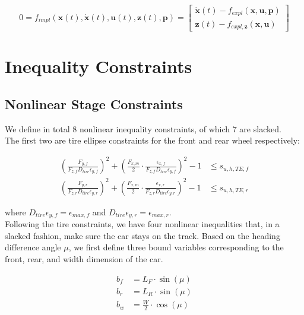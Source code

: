 \documentclass[
a4paper, %
10pt, %
notitlepage,
english]{CSUniSchoolLabReport}
\begin{document}
\begin{equation}
	0 = f_{impl}(\mathbf{x}(t), \dot{\mathbf{x}}(t), \mathbf{u}(t), \mathbf{z}(t), \mathbf{p}) =
	\left[\begin{array}{c}
		\dot{\mathbf{x}}(t) - f_{expl}(\mathbf{x}, \mathbf{u}, \mathbf{p}) \\
		\mathbf{z}(t) - f_{expl, \mathbf{z}}(\mathbf{x}, \mathbf{u})
	\end{array}\right]
\end{equation}


\section{Inequality Constraints}

\subsection{Nonlinear Stage Constraints}

We define in total 8 nonlinear inequality constraints, of which 7 are slacked.\\
The first two are tire ellipse constraints for the front and rear wheel respectively:

\begin{align}
	\left( \frac{F_{y, f}} {F_{z, f} D_{tire} \epsilon_{y, f}} \right)^2
	+ \left(\frac{F_{x,m}}{2} \cdot \frac{\epsilon_{x, f}}{F_{z, f} D_{tire} \epsilon_{y, f}} \right) ^2
	- 1
	&\leq s_{u,h,TE,f} \\
	\left( \frac{F_{y, r}} {F_{z, r} D_{tire} \epsilon_{y, r}} \right)^2
	+ \left(\frac{F_{x,m}}{2} \cdot \frac{\epsilon_{x, r}}{F_{z, r} D_{tire} \epsilon_{y, r}} \right) ^2
	- 1
	&\leq s_{u,h,TE,r}
\end{align}

where $D_{tire} \epsilon_{y, f} = \epsilon_{max, f}$ and $D_{tire} \epsilon_{y, r} = \epsilon_{max, r}$.\\
Following the tire constraints, we have four nonlinear inequalities that, in a slacked fashion, make sure the car stays on the track. Based on the heading difference angle $\mu$, we first define three bound variables corresponding to the front, rear, and width dimension of the car.

\begin{align}
	b_f &= L_F \cdot \sin(\mu) \\
	b_r &= L_R \cdot \sin(\mu) \\
	b_w &= \frac{W}{2} \cdot \cos(\mu)
\end{align}
\end{document}
